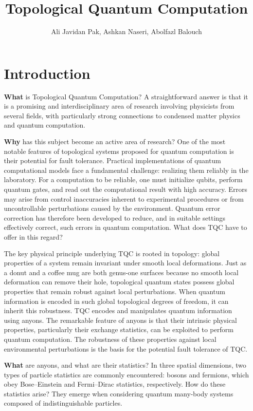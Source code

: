 \documentclass[11pt]{article}
\title{Topological Quantum Computation}
\author{Ali Javidan Pak, Ashkan Naseri, Abolfazl Balouch}
\date{}
\begin{document}
	
	\maketitle
	
	\section*{Introduction}
	
	\textbf{What} is Topological Quantum Computation? A straightforward answer is that it is a promising and interdisciplinary area of research involving physicists from several fields, with particularly strong connections to condensed matter physics and quantum computation.
	
	\textbf{Why} has this subject become an active area of research? One of the most notable features of topological systems proposed for quantum computation is their potential for fault tolerance. Practical implementations of quantum computational models face a fundamental challenge: realizing them reliably in the laboratory. For a computation to be reliable, one must initialize qubits, perform quantum gates, and read out the computational result with high accuracy. Errors may arise from control inaccuracies inherent to experimental procedures or from uncontrollable perturbations caused by the environment. Quantum error correction has therefore been developed to reduce, and in suitable settings effectively correct, such errors in quantum computation. What does TQC have to offer in this regard?
	
	The key physical principle underlying TQC is rooted in topology: global properties of a system remain invariant under smooth local deformations. Just as a donut and a coffee mug are both genus-one surfaces because no smooth local deformation can remove their hole, topological quantum states possess global properties that remain robust against local perturbations. When quantum information is encoded in such global topological degrees of freedom, it can inherit this robustness. TQC encodes and manipulates quantum information using anyons. The remarkable feature of anyons is that their intrinsic physical properties, particularly their exchange statistics, can be exploited to perform quantum computation. The robustness of these properties against local environmental perturbations is the basis for the potential fault tolerance of TQC.
	
	\textbf{What} are anyons, and what are their statistics? In three spatial dimensions, two types of particle statistics are commonly encountered: bosons and fermions, which obey Bose--Einstein and Fermi--Dirac statistics, respectively. How do these statistics arise? They emerge when considering quantum many-body systems composed of indistinguishable particles.
	
\end{document}
